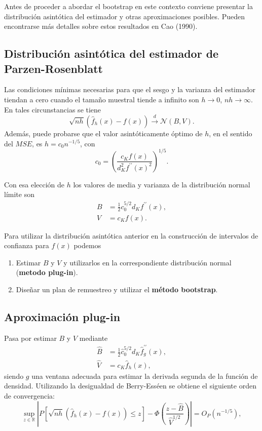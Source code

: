 \documentclass[
]{book}
\theoremstyle{break}
\theoremstyle{nonumberplain}
\begin{document}
Antes de proceder a abordar el bootstrap en este contexto conviene
presentar la distribución asintótica del estimador y otras
aproximaciones posibles. Pueden encontrarse más detalles sobre estos
resultados en Cao (1990).

\subsection{Distribución asintótica del estimador de Parzen-Rosenblatt}\label{distribuciuxf3n-asintuxf3tica-del-estimador-de-parzen-rosenblatt}

Las condiciones mínimas necesarias para que el sesgo y la varianza del
estimador tiendan a cero cuando el tamaño muestral tiende a infinito son \(h\rightarrow 0\), \(nh\rightarrow \infty\).
En tales circunstancias se tiene
\[\sqrt{nh}\left( \hat{f}_{h}\left( x \right) -f\left( x \right) \right) \overset{d}{\rightarrow} \mathcal{N}\left( B,V \right).\]
Además, puede probarse que el valor asintóticamente óptimo de \(h\),
en el sentido del \(MSE\), es \(h=c_{0}n^{-1/5}\), con
\[c_{0}=\left( \frac{c_{K}f\left( x \right)}{d_{K}^2f^{\prime \prime }\left(x \right)^2} \right)^{1/5}.\]

Con esa elección de \(h\) los valores de media y varianza de la
distribución normal límite son\[\begin{aligned}
B &= \frac{1}{2}c_{0}^{5/2}d_{K}f^{\prime \prime }\left( x \right), \\
V &= c_{K}f\left( x \right).\end{aligned}\]

Para utilizar la distribución asintótica anterior en la construcción de
intervalos de confianza para \(f\left( x \right)\) podemos

\begin{enumerate}
\def\labelenumi{\arabic{enumi}.}
\item
  Estimar \(B\) y \(V\) y utilizarlos en la correspondiente distribución
  normal (\textbf{metodo plug-in}).
\item
  Diseñar un plan de remuestreo y utilizar el \textbf{método bootstrap}.
\end{enumerate}

\subsection{Aproximación plug-in}\label{aproximaciuxf3n-plug-in}

Pasa por estimar \(B\) y \(V\) mediante\[\begin{aligned}
\hat{B} &= \frac{1}{2}\hat{c}_{0}^{5/2}d_{K}\hat{f}_{g}^{\prime \prime
}\left( x \right), \\
\hat{V} &= c_{K}\hat{f}_{h}\left( x \right),\end{aligned}\]siendo \(g\)
una ventana adecuada para estimar la derivada segunda de la función de
densidad. Utilizando la desigualdad de Berry-Esséen se obtiene el
siguiente orden de
convergencia:\[\sup_{z\in \mathbb{R}}\left\vert P\left[ \sqrt{nh}\left( \hat{f}
_{h}\left( x \right) -f\left( x \right) \right) \leq z\right] -\Phi \left( 
\frac{z-\hat{B}}{\hat{V}^{1/2}} \right) \right\vert =O_{P}\left(
n^{-1/5} \right),\]
\end{document}
